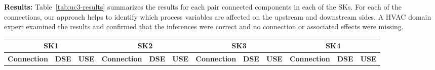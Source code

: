 \documentclass[sigconf]{acmart}
\begin{document}

\textbf{Results:} Table~\ref{tab:uc3-results} summarizes the results for each pair connected components in each of the SKs.
For each of the connections, our approach helps to identify which process variables are affected on the upstream and downstream sides.
%
A HVAC domain expert examined the results and confirmed that the inferences were correct and no connection or associated effects were missing.

\begin{table}[]
\begin{tabular}{|lll|lll|lll|lll|}
\hline
\multicolumn{3}{|c|}{\textbf{SK1}}                                                                                                                                                                                                                                                                                                              & \multicolumn{3}{c|}{\textbf{SK2}}                                                                                                                                                                                           & \multicolumn{3}{c|}{\textbf{SK3}}                                                                                                                                                                                                                                                  & \multicolumn{3}{c|}{\textbf{SK4}}                                                                                                                                                                                                                                                         \\ \hline
\multicolumn{1}{|l|}{\textbf{Connection}}                                                                                                             & \multicolumn{1}{l|}{\textbf{DSE}}                                                                     & \textbf{USE}                                                                    & \multicolumn{1}{l|}{\textbf{Connection}}                                                   & \multicolumn{1}{l|}{\textbf{DSE}}                                        & \textbf{USE}                                        & \multicolumn{1}{l|}{\textbf{Connection}}                                                                             & \multicolumn{1}{l|}{\textbf{DSE}}                                                       & \textbf{USE}                                                      & \multicolumn{1}{l|}{\textbf{Connection}}                                                                                     & \multicolumn{1}{l|}{\textbf{DSE}}                                                      & \textbf{USE}                                                      \\ \hline

\end{tabular}
\end{table}
\end{document}
